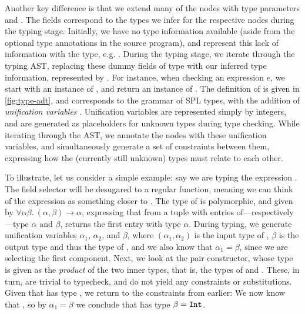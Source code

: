 Another key difference is that we extend many of the nodes with type
parameters  and . The fields correspond to the types we
infer for the respective nodes during the typing stage.
Initially, we have no type information available (aside from the optional type
annotations in the source program), and represent this lack of information
with the \haskell{()} type, e.g. . During the typing stage, we
iterate through the typing AST, replacing these dummy fields of type \haskell{()}
with our inferred type information, represented by .
For instance, when checking an expression $e$, we start with an instance of
, and return an instance of .
The definition of  is given in \cref{fig:type-adt}, and
corresponds to the grammar of SPL types, with the addition of \emph{unification
variables} .
Unification variables are represented simply by integers, and are generated as
placeholders for unknown types during type checking. While iterating through the
AST, we annotate the nodes with these unification variables, and simultaneously
generate a set of constraints between them, expressing how the (currently still
unknown) types must relate to each other.

To illustrate, let us consider a simple example: say we are typing the
expression . The field selector  will be desugared
to a regular function, meaning we can think of the expression as something
closer to . The type of  is polymorphic, and
given by $\forall \alpha \beta.\ (\alpha,\beta) \to \alpha$, expressing that
from a tuple with entries of---respectively---type $\alpha$ and $\beta$,
 returns the first entry with type $\alpha$.
During typing, we generate unification variables $\alpha_1$, $\alpha_2$, and
$\beta$, where $(\alpha_1,\alpha_2)$ is the input type of , $\beta$
is the output type and thus the type of , and we also know
that $\alpha_1 = \beta$, since we are selecting the first component.
Next, we look at the pair constructor, whose type is given as the \emph{product}
of the two inner types, that is, the types of  and .
These, in turn, are trivial to typecheck, and do not yield any constraints or
substitutions. Given that  has type , we return
to the constraints from earlier:
We now know that , so by
$\alpha_1 = \beta$ we conclude that  has type
$\beta = \texttt{Int}$.

